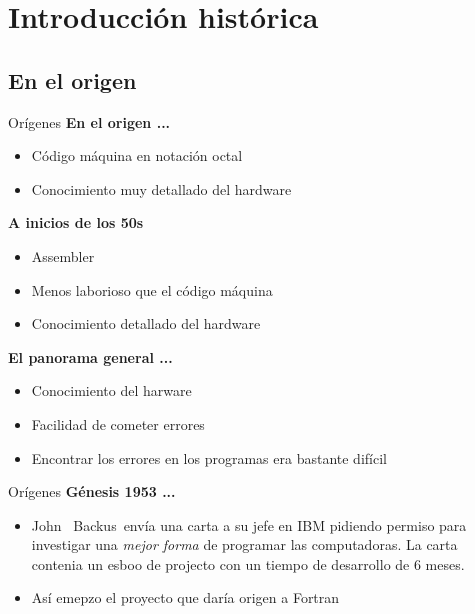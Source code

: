 \section{Introducción histórica}


\subsection{En el origen}
\begin{frame}[fragile]{Orígenes}
  \textbf{En el origen ...}
  \begin{itemize}[<+(1)->]
      \item Código máquina en notación octal
      \item Conocimiento muy detallado del hardware
  \end{itemize}

  \textbf{A inicios de los 50s}
  \begin{itemize}[<+(2)->]
    \item Assembler
    \item Menos laborioso que el código máquina
    \item Conocimiento detallado del hardware
  \end{itemize}

  \textbf{El panorama general ...}
  \begin{itemize}[<+(3)->]
    \item Conocimiento del harware
    \item Facilidad de cometer errores
    \item Encontrar los errores en los programas era bastante difícil
  \end{itemize}
\end{frame}


\begin{frame}[fragile]{Orígenes}
  \textbf{Génesis 1953 ...}
  \begin{itemize}[<+(1)->]
    \item[] John  Backus envía una carta a su jefe en IBM pidiendo permiso para
      investigar una \textit{mejor forma} de programar las computadoras. La
      carta contenia un esboo de projecto con un tiempo de desarrollo de 6
      meses.
    \item[] Así emepzo el proyecto que daría origen a Fortran
  \end{itemize}
\end{frame}


